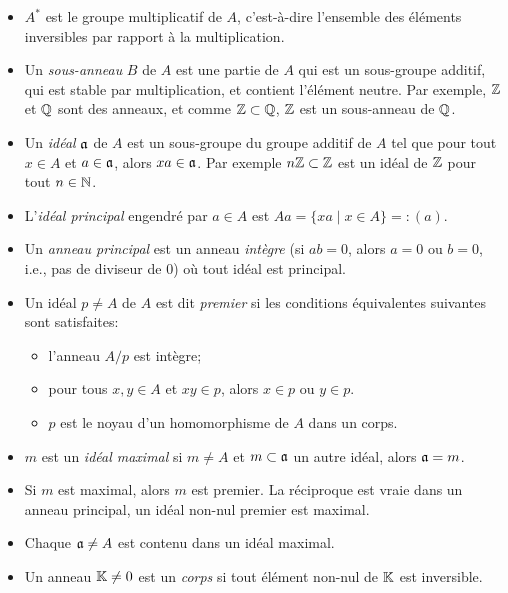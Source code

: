 \begin{itemize}
\item $A^\ast$ est le groupe multiplicatif de $A$, c'est-à-dire l'ensemble des éléments inversibles par
  rapport à la multiplication.

\item Un \emph{sous-anneau} $B$ de $A$ est une partie de $A$ qui est un sous-groupe additif, qui est stable
  par multiplication, et contient l'élément neutre. Par exemple, $\mathbb{Z}$ et $\mathbb{Q}$ sont des anneaux, et comme $\mathbb{Z}
  \subset \mathbb{Q}$, $\mathbb{Z}$ est un sous-anneau de $\mathbb{Q}$.

\item Un \emph{idéal} $\mathfrak{a}$ de $A$ est un sous-groupe du groupe additif de $A$ tel que pour tout $x \in A$ et $a
  \in \mathfrak{a}$, alors $xa \in \mathfrak{a}$. Par exemple $n\mathbb{Z} \subset \mathbb{Z}$ est un idéal de $\mathbb{Z}$ pour tout $n \in \mathbb{N}$.

\item L'\emph{idéal principal} engendré par $a \in A$ est $Aa = \{xa \mid x \in A\} =: (a)$.

\item Un \emph{anneau principal} est un anneau \emph{intègre} (si $ab = 0$, alors $a = 0$ ou $b = 0$, i.e.,
  pas de diviseur de $0$) où tout idéal est principal.

\item Un idéal $p \neq A$ de $A$ est dit \emph{premier} si les conditions équivalentes suivantes sont satisfaites:
  \begin{itemize}
  \item l'anneau $A/p$ est intègre;
  \item pour tous $x, y \in A$ et $xy \in p$, alors $x \in p$ ou $y \in p$.
  \item $p$ est le noyau d'un homomorphisme de $A$ dans un corps.
  \end{itemize}

\item $m$ est un \emph{idéal maximal} si $m \neq A$ et $m \subset \mathfrak{a}$ un autre idéal, alors $\mathfrak{a} = m$.

\item Si $m$ est maximal, alors $m$ est premier. La réciproque est vraie dans un anneau principal, un idéal
  non-nul premier est maximal.

\item Chaque $\mathfrak{a} \neq A$ est contenu dans un idéal maximal.

\item Un anneau $\mathbb{K} \neq 0$ est un \emph{corps} si tout élément non-nul de $\mathbb{K}$ est inversible.


\end{itemize}
